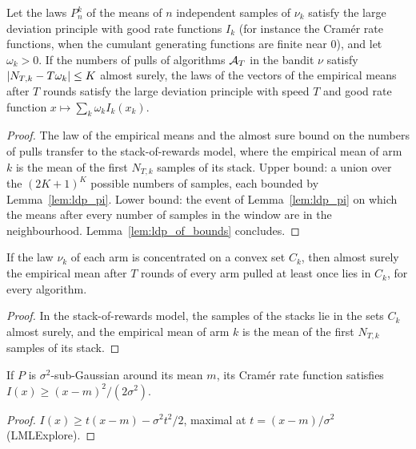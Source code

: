 \begin{lemma}
  \label{lem:ldp_window}
  \leanok
  Let the laws $P^k_n$ of the means of $n$ independent samples of $\nu_k$ satisfy the large
  deviation principle with good rate functions $I_k$ (for instance the Cramér rate functions, when
  the cumulant generating functions are finite near $0$), and let $\omega_k > 0$. If the numbers of
  pulls of algorithms $\mathcal{A}_T$ in the bandit $\nu$ satisfy $\lvert N_{T,k} - T \omega_k \rvert \le K$ almost
  surely, the laws of the vectors of the empirical means after $T$ rounds satisfy the large
  deviation principle with speed $T$ and good rate function $x \mapsto \sum_k \omega_k I_k(x_k)$.
\end{lemma}

\begin{proof}
  \leanok
  The law of the empirical means and the almost sure bound on the numbers of pulls transfer to
  the stack-of-rewards model, where the empirical mean of arm $k$ is the mean of the first
  $N_{T,k}$ samples of its stack. Upper bound: a union over the $(2K + 1)^K$ possible numbers of
  samples, each bounded by Lemma~\ref{lem:ldp_pi}. Lower bound: the event of
  Lemma~\ref{lem:ldp_pi} on which the means after every number of samples in the window are in
  the neighbourhood. Lemma~\ref{lem:ldp_of_bounds} concludes.
\end{proof}

\begin{lemma}
  \label{lem:empMean_mem}
  \leanok
  If the law $\nu_k$ of each arm is concentrated on a convex set $C_k$, then almost surely the
  empirical mean after $T$ rounds of every arm pulled at least once lies in $C_k$, for every
  algorithm.
\end{lemma}

\begin{proof}
  \leanok
  In the stack-of-rewards model, the samples of the stacks lie in the sets $C_k$ almost surely,
  and the empirical mean of arm $k$ is the mean of the first $N_{T,k}$ samples of its stack.
\end{proof}

\begin{lemma}
  \label{lem:rate_ge_sq_of_subgaussian}
  \leanok
  If $P$ is $\sigma^2$-sub-Gaussian around its mean $m$, its Cramér rate function satisfies
  $I(x) \ge (x - m)^2 / (2 \sigma^2)$.
\end{lemma}

\begin{proof}
  \leanok
  $I(x) \ge t (x - m) - \sigma^2 t^2 / 2$, maximal at $t = (x - m) / \sigma^2$ (LMLExplore).
\end{proof}
